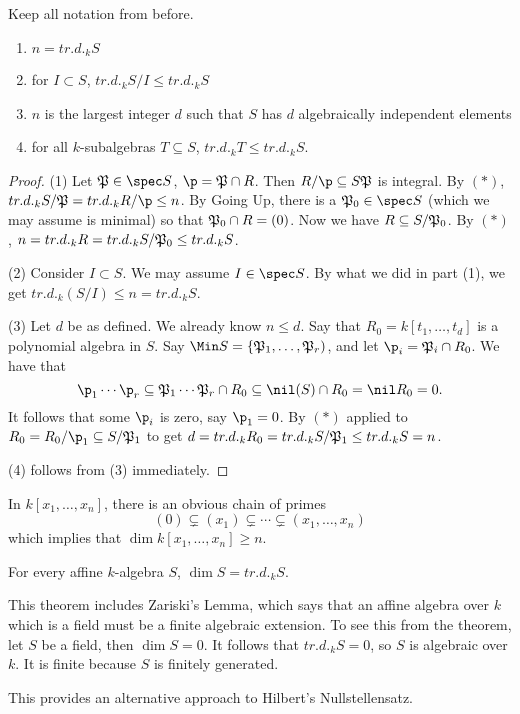  \begin{theorem}
   Keep all notation from before.
   \begin{enumerate}
     \item $n=tr.d._k S$
     \item for $I\subset S$, $tr.d._k S/I\le tr.d._k S$
     \item $n$ is the largest integer $d$ such that $S$ has $d$ algebraically independent elements
     \item for all $k$-subalgebras $T\subseteq S$, $tr.d._k T\le tr.d._k S$.
   \end{enumerate}
 \end{theorem}
 \begin{proof}
   (1) Let $\P\in \spec S$, $\p=\P\cap R$. Then $R/\p\subseteq S\P$ is integral. By
   $(\ast)$, $tr.d._k S/\P = tr.d._k R/\p\le n$. By Going Up, there is a $\P_0\in \spec
   S$ (which we may assume is minimal) so that $\P_0\cap R=(0)$. Now we have $R\subseteq
   S/\P_0$. By $(\ast)$, $n=tr.d._k R= tr.d._k S/\P_0\le tr.d._k S$.

   (2) Consider $I\subset S$. We may assume $I\in \spec S$. By what we did in part (1), we get
   $tr.d._k (S/I)\le n=tr.d._k S$.

   (3) Let $d$ be as defined. We already know $n\le d$. Say that $R_0=k[t_1,\dots, t_d]$
   is a polynomial algebra in $S$. Say $\Min S=\{\P_1,\dots, \P_r)$, and let $\p_i =
   \P_i\cap R_0$. We have that
   \[
   \p_1\cdots \p_r \subseteq \P_1\cdots \P_r \cap R_0 \subseteq \nil (S)\cap R_0 = \nil R_0 =
   0.
   \]
   It follows that some $\p_i$ is zero, say $\p_1=0$. By $(\ast)$ applied to
   $R_0=R_0/\p_1\subseteq S/\P_1$ to get $d=tr.d._k R_0 = tr.d._k S/\P_1 \le tr.d._k
   S=n$.

   (4) follows from (3) immediately.
 \end{proof}
 In $k[x_1,\dots, x_n]$, there is an obvious chain of primes
 \[
  (0)\subsetneq (x_1)\subsetneq \cdots \subsetneq (x_1,\dots, x_n)
 \]
 which implies that $\dim k[x_1,\dots, x_n]\ge n$.
 \begin{theorem} \label{lec41T:dim=trd}
   For every affine $k$-algebra $S$, $\dim S=tr.d._k S$.
 \end{theorem}
 \begin{remark}
   This theorem includes Zariski's Lemma, which says that an affine algebra over $k$
   which is a field must be a finite algebraic extension. To see this from the theorem,
   let $S$ be a field, then $\dim S=0$. It follows that $tr.d._k S=0$, so $S$ is
   algebraic over $k$. It is finite because $S$ is finitely generated.

   This provides an alternative approach to Hilbert's Nullstellensatz.
 \end{remark}
